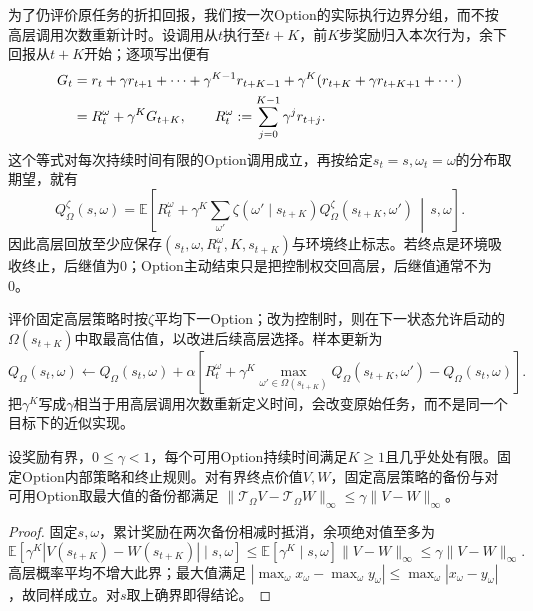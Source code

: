 为了仍评价原任务的折扣回报，我们按一次Option的实际执行边界分组，而不按高层调用次数重新计时。设调用从$t$执行至$t+K$，前$K$步奖励归入本次行为，余下回报从$t+K$开始；逐项写出便有
\begin{align}
 G_t
   &=r_t+\gamma r_{t+1}+\cdots+\gamma^{K-1}r_{t+K-1}
          +\gamma^K(r_{t+K}+\gamma r_{t+K+1}+\cdots)\notag\\
   &=R_t^\omega+\gamma^K G_{t+K},\qquad
 R_t^\omega:=\sum_{j=0}^{K-1}\gamma^j r_{t+j}.
 \label{eq:rl-learning-option-grouping}
\end{align}
这个等式对每次持续时间有限的Option调用成立，再按给定$s_t=s,\omega_t=\omega$的分布取期望，就有
\begin{equation}
 Q^\zeta_\Omega(s,\omega)
  =\mathbb E\left[
       R_t^\omega+\gamma^K
          \sum_{\omega'}\zeta(\omega'\mid s_{t+K})
                       Q^\zeta_\Omega(s_{t+K},\omega')
                    \,\middle|\,s,\omega\right].
 \label{eq:rl-learning-option-bellman}
\end{equation}
因此高层回放至少应保存$(s_t,\omega,R_t^\omega,K,s_{t+K})$与环境终止标志。若终点是环境吸收终止，后继值为0；Option主动结束只是把控制权交回高层，后继值通常不为0。

评价固定高层策略时按$\zeta$平均下一Option；改为控制时，则在下一状态允许启动的$\Omega(s_{t+K})$中取最高估值，以改进后续高层选择。样本更新为
\[
 Q_\Omega(s_t,\omega)\leftarrow Q_\Omega(s_t,\omega)+
  \alpha\left[R_t^\omega+
        \gamma^K\max_{\omega'\in\Omega(s_{t+K})}
                          Q_\Omega(s_{t+K},\omega')
                     -Q_\Omega(s_t,\omega)\right].
\]
把$\gamma^K$写成$\gamma$相当于用高层调用次数重新定义时间，会改变原始任务，而不是同一个目标下的近似实现。

\begin{theorem}[Option备份的压缩性]
  \label{thm:rl-learning-option-contraction}
  设奖励有界，$0\leq\gamma<1$，每个可用Option持续时间满足$K\geq1$且几乎处处有限。固定Option内部策略和终止规则。对有界终点价值$V,W$，固定高层策略的备份与对可用Option取最大值的备份都满足
  $\|\mathcal T_\Omega V-\mathcal T_\Omega W\|_\infty
    \leq\gamma\|V-W\|_\infty$。
\end{theorem}

\begin{proof}
  固定$s,\omega$，累计奖励在两次备份相减时抵消，余项绝对值至多为
  \[
    \mathbb E[\gamma^K|V(s_{t+K})-W(s_{t+K})|\mid s,\omega]
      \leq\mathbb E[\gamma^K\mid s,\omega]\|V-W\|_\infty
      \leq\gamma\|V-W\|_\infty.
  \]
  高层概率平均不增大此界；最大值满足
  $|\max_\omega x_\omega-\max_\omega y_\omega|
       \leq\max_\omega|x_\omega-y_\omega|$，故同样成立。对$s$取上确界即得结论。
\end{proof}


